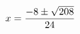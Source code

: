 \documentclass[preview]{standalone}
\begin{document}
\begin{align*}
\special{dvisvgm:raw <g id='unique000'>}x=\frac{-8\pm\sqrt{208}}{24}\special{dvisvgm:raw </g>}
\end{align*}
\end{document}
